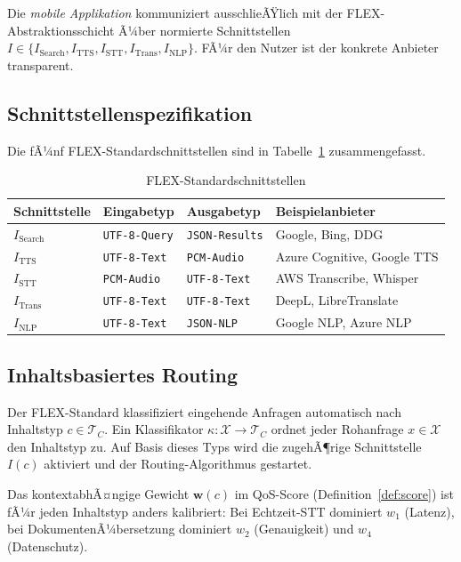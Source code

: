 ﻿\documentclass[a4paper,12pt]{article}
\theoremstyle{definition}
\begin{document}
\medskip
\noindent
Die \emph{mobile Applikation} kommuniziert ausschlieÃŸlich mit der FLEX-Abstraktionsschicht Ã¼ber normierte Schnittstellen $I \in \{I_\mathrm{Search}, I_\mathrm{TTS}, I_\mathrm{STT}, I_\mathrm{Trans}, I_\mathrm{NLP}\}$. FÃ¼r den Nutzer ist der konkrete Anbieter transparent.

\subsection{Schnittstellenspezifikation}

Die fÃ¼nf FLEX-Standardschnittstellen sind in Tabelle~\ref{tab:interfaces} zusammengefasst.

\begin{table}[h]
\centering
\caption{FLEX-Standardschnittstellen}
\label{tab:interfaces}
\begin{tabular}{llll}
\toprule
Schnittstelle & Eingabetyp & Ausgabetyp & Beispielanbieter \\
\midrule
$I_\mathrm{Search}$ & \texttt{UTF-8-Query} & \texttt{JSON-Results} & Google, Bing, DDG \\
$I_\mathrm{TTS}$    & \texttt{UTF-8-Text} & \texttt{PCM-Audio} & Azure Cognitive, Google TTS \\
$I_\mathrm{STT}$    & \texttt{PCM-Audio} & \texttt{UTF-8-Text} & AWS Transcribe, Whisper \\
$I_\mathrm{Trans}$  & \texttt{UTF-8-Text} & \texttt{UTF-8-Text} & DeepL, LibreTranslate \\
$I_\mathrm{NLP}$    & \texttt{UTF-8-Text} & \texttt{JSON-NLP} & Google NLP, Azure NLP \\
\bottomrule
\end{tabular}
\end{table}

\subsection{Inhaltsbasiertes Routing}

Der FLEX-Standard klassifiziert eingehende Anfragen automatisch nach Inhaltstyp $c \in \mathcal{T}_C$. Ein Klassifikator $\kappa: \mathcal{X} \to \mathcal{T}_C$ ordnet jeder Rohanfrage $x \in \mathcal{X}$ den Inhaltstyp zu. Auf Basis dieses Typs wird die zugehÃ¶rige Schnittstelle $I(c)$ aktiviert und der Routing-Algorithmus gestartet.

Das kontextabhÃ¤ngige Gewicht $\mathbf{w}(c)$ im QoS-Score (Definition~\ref{def:score}) ist fÃ¼r jeden Inhaltstyp anders kalibriert: Bei Echtzeit-STT dominiert $w_1$ (Latenz), bei DokumentenÃ¼bersetzung dominiert $w_2$ (Genauigkeit) und $w_4$ (Datenschutz).
\end{document}
